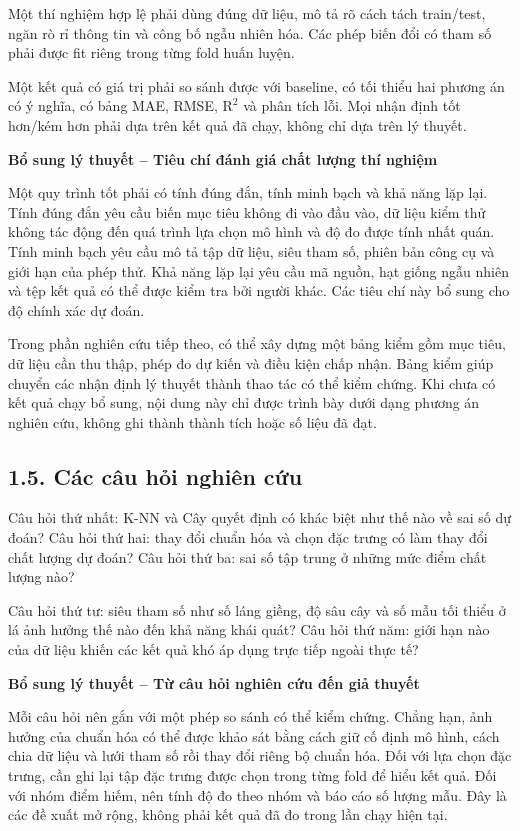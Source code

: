 \documentclass[12pt,a4paper,oneside]{article}
\begin{document}
Một thí nghiệm hợp lệ phải dùng đúng dữ liệu, mô tả rõ cách tách
train/test, ngăn rò rỉ thông tin và công bố ngẫu nhiên hóa. Các phép
biến đổi có tham số phải được fit riêng trong từng fold huấn luyện.

Một kết quả có giá trị phải so sánh được với baseline, có tối thiểu hai
phương án có ý nghĩa, có bảng MAE, RMSE, \(\text{R}^{\text{2}}\) và phân
tích lỗi. Mọi nhận định tốt hơn/kém hơn phải dựa trên kết quả đã chạy,
không chỉ dựa trên lý thuyết.


\par\noindent\textbf{Bổ sung lý thuyết -- Tiêu chí đánh giá chất lượng thí nghiệm}\par
Một quy trình tốt phải có tính đúng đắn, tính minh bạch và khả năng lặp lại. Tính đúng đắn yêu cầu biến mục tiêu không đi vào đầu vào, dữ liệu kiểm thử không tác động đến quá trình lựa chọn mô hình và độ đo được tính nhất quán. Tính minh bạch yêu cầu mô tả tập dữ liệu, siêu tham số, phiên bản công cụ và giới hạn của phép thử. Khả năng lặp lại yêu cầu mã nguồn, hạt giống ngẫu nhiên và tệp kết quả có thể được kiểm tra bởi người khác. Các tiêu chí này bổ sung cho độ chính xác dự đoán.\par

Trong phần nghiên cứu tiếp theo, có thể xây dựng một bảng kiểm gồm mục tiêu, dữ liệu cần thu thập, phép đo dự kiến và điều kiện chấp nhận. Bảng kiểm giúp chuyển các nhận định lý thuyết thành thao tác có thể kiểm chứng. Khi chưa có kết quả chạy bổ sung, nội dung này chỉ được trình bày dưới dạng phương án nghiên cứu, không ghi thành thành tích hoặc số liệu đã đạt.\par

\subsection*{1.5. Các câu hỏi nghiên cứu}

Câu hỏi thứ nhất: K-NN và Cây quyết định có khác biệt như thế nào về sai
số dự đoán? Câu hỏi thứ hai: thay đổi chuẩn hóa và chọn đặc trưng có làm
thay đổi chất lượng dự đoán? Câu hỏi thứ ba: sai số tập trung ở những
mức điểm chất lượng nào?

Câu hỏi thứ tư: siêu tham số như số láng giềng, độ sâu cây và số mẫu tối
thiểu ở lá ảnh hưởng thế nào đến khả năng khái quát? Câu hỏi thứ năm:
giới hạn nào của dữ liệu khiến các kết quả khó áp dụng trực tiếp ngoài
thực tế?


\par\noindent\textbf{Bổ sung lý thuyết -- Từ câu hỏi nghiên cứu đến giả thuyết}\par
Mỗi câu hỏi nên gắn với một phép so sánh có thể kiểm chứng. Chẳng hạn, ảnh hưởng của chuẩn hóa có thể được khảo sát bằng cách giữ cố định mô hình, cách chia dữ liệu và lưới tham số rồi thay đổi riêng bộ chuẩn hóa. Đối với lựa chọn đặc trưng, cần ghi lại tập đặc trưng được chọn trong từng fold để hiểu kết quả. Đối với nhóm điểm hiếm, nên tính độ đo theo nhóm và báo cáo số lượng mẫu. Đây là các đề xuất mở rộng, không phải kết quả đã đo trong lần chạy hiện tại.\par
\end{document}
